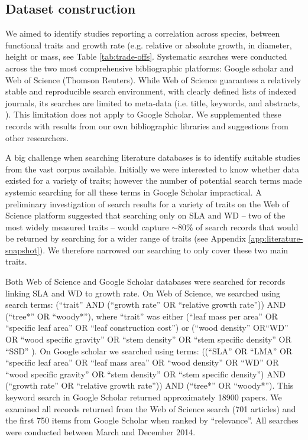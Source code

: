 \documentclass[a4paper,11pt]{article}
\begin{document}
\subsection*{Dataset construction}\label{data-construction}

We aimed to identify studies reporting a correlation across species, between functional traits and growth rate (e.g. relative or absolute growth, in diameter, height or mass, see Table \ref{tab:trade-offs}. Systematic searches were conducted across the two most comprehensive bibliographic platforms: Google scholar and Web of Science (Thomson Reuters). While Web of Science guarantees a relatively stable and reproducible search environment, with clearly defined lists of indexed journals, its searches are limited to meta-data (i.e. title, keywords, and abstracts, \citealt{Beckmann:2012hn}). This limitation does not apply to Google Scholar. We supplemented these records with results from our own bibliographic libraries and suggestions from other researchers. 

A big challenge when searching literature databases is to identify suitable studies from the vast corpus available. Initially we were interested to know whether data existed for a variety of traits; however the number of potential search terms made systemic searching for all these terms in Google Scholar impractical. A preliminary investigation of search results for a variety of traits on the Web of Science platform suggested that searching only on SLA and WD -- two of the most widely measured traits -- would capture $\sim$80\% of search records that would be returned by searching for a wider range of traits (see Appendix \ref{app:literature-snapshot}). We therefore narrowed our searching to only cover these two main traits.

Both Web of Science and Google Scholar databases were searched for records linking SLA and WD to growth rate. On Web of Science, we searched using  search terms: (``trait'' AND (``growth rate'' OR ``relative growth rate'')) AND (``tree*'' OR ``woody*''), where ``trait'' was either (``leaf mass per area'' OR ``specific leaf area'' OR ``leaf construction cost'') or (``wood density'' OR``WD'' OR ``wood specific gravity'' OR ``stem density'' OR ``stem specific density'' OR ``SSD'' ). On Google scholar we searched using terms: ((``SLA'' OR ``LMA'' OR ``specific leaf area'' OR ``leaf mass area'' OR ``wood density'' OR ``WD'' OR ``wood specific gravity'' OR ``stem density'' OR ``stem specific density'') AND (``growth rate'' OR ``relative growth rate'')) AND (``tree*'' OR ``woody*''). This keyword search in Google Scholar returned approximately 18900 papers. We examined all records returned from the Web of Science search (701 articles) and the first 750 items from Google Scholar when ranked by ``relevance''. All searches were conducted between March and December 2014.
\end{document}
